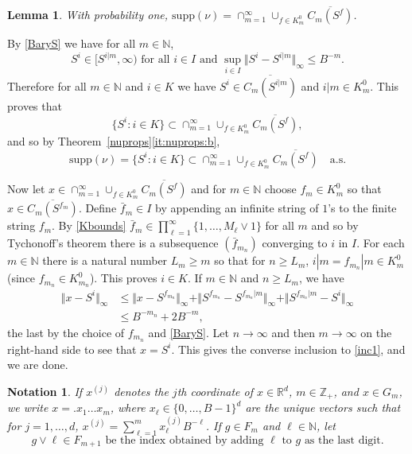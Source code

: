 \documentclass[12pt]{article}
\makeatletter
\renewenvironment{proof}[1][\proofname]{%
\par\pushQED{\qed}\normalfont%
\topsep6\p@\@plus6\p@\relax
\trivlist\item[\hskip\labelsep\bfseries#1\@addpunct{.}]%
\ignorespaces
}{%
\popQED\endtrivlist\@endpefalse
}
\numberwithin{theorem}{section}
\newtheorem{lemma}[theorem]{Lemma}
\theoremstyle{def}
\newtheorem*{notation}{Notation}
\numberwithin{equation}{section}
\newcommand{\R}{\mathbb{R}}
\newcommand{\Z}{\mathbb{Z}}
\newcommand{\N}{\mathbb{N}}
\newcommand{\supp}{\mathrm{supp}}
\makeatother
\begin{document}
\begin{lemma}\label{Cantor}
With probability one, $\supp(\nu)=\cap_{m=1}^\infty\cup_{f\in K^0_m}\overline{C_m(S^f)}$.
\end{lemma}
\begin{proof}
 By \eqref{BaryS} we have for all $m\in\N$,
\[S^i\in[S^{i|m},\infty)\text{ for all $i\in I$ and }\sup_{i\in I}\Vert S^i-S^{i|m}\Vert_\infty\le B^{-m}.\]
Therefore for all $m\in\N$ and $i\in K$ we have $S^i\in \overline{C_m(S^{i|m})}$ and $i|m\in K^0_m$.  This proves that 
\[\{S^i:i\in K\}\subset \cap_{m=1}^\infty\cup_{f\in K^0_m}\overline{C_m(S^f)},\]
and so  by Theorem~\ref{nuprops}\ref{it:nuprops:b}, 
\begin{equation}\label{inc1}\supp(\nu)=\{S^i:i\in K\}\subset\cap_{m=1}^\infty\cup_{f\in K^0_m}\overline{C_m(S^f)}\quad \text{a.s.}
\end{equation}

Now let $x\in\cap_{m=1}^\infty\cup_{f\in K^0_m}\overline{C_m(S^f)}$ and for $m\in\N$ choose $f_m\in K^0_m$ so that $x\in \overline{C_m(S^{f_m})}$. 
Define $\bar f_m\in I$
by appending an infinite string of $1$'s to the finite string $f_m$.  
By \eqref{Kbounds} $\bar f_m\in\prod_{\ell=1}^\infty\{1,\dots,M_\ell\vee 1\}$ for all $m$ and so by Tychonoff's theorem there is a subsequence $(\bar f_{m_n})$ converging to $i$ in $I$.  For each $m\in\N$ there is a natural number $L_m\ge m$ so that for $n\ge L_m$, $i|m=f_{m_n}|m\in K^0_m$ (since $f_{m_n}\in K^0_{m_n}$).  This proves $i\in K$.  If $m\in \N$ and $n\ge L_m$, we have 
\begin{align*}
\Vert x-S^i\Vert_\infty&\le \Vert x-S^{f_{m_n}}\Vert_\infty+\Vert S^{f_{m_n}}-S^{f_{m_n}|m}\Vert_\infty+\Vert S^{f_{m_n}|m}-S^i\Vert_\infty\\
&\le B^{-m_n}+2 B^{-m},
\end{align*}
the last by the choice of $f_{m_n}$ and \eqref{BaryS}. Let $n\to\infty$ and then $m\to\infty$ on the right-hand side to see that $x=S^i$.
This gives the converse inclusion to \eqref{inc1}, and we are done. 
\end{proof}

\begin{notation}  If $x^{(j)}$ denotes the $j$th coordinate of $x\in\R^d$, $m\in\Z_+$, and $x\in G_m$, we write $x=.x_1\dots x_m$, where $x_\ell\in\{0,\dots,B-1\}^d$ are the unique vectors such that for $j=1,\dots,d$, $x^{(j)}=\sum_{\ell=1}^mx_\ell^{(j)}B^{-\ell}$. 
If $g\in F_m$ and $\ell\in\N$, let 
\begin{equation}\label{veenotation}
\text{$g\vee \ell\in F_{m+1}$ be the index obtained by adding $\ell$ to $g$ as the last digit.}
\end{equation} 
\end{notation}
\end{document}
